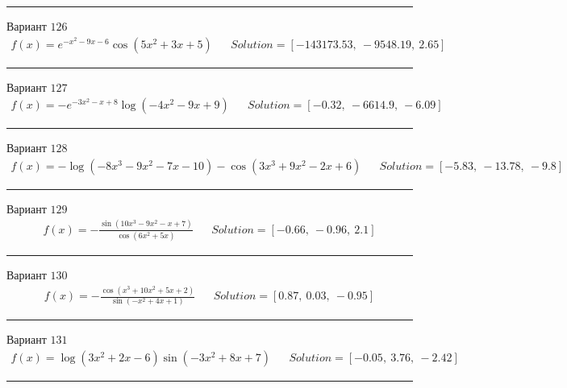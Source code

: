 \documentclass[11pt]{report}
\begin{document}
\begin{center}
    \noindent\rule{8cm}{0.4pt}
\end{center}
Вариант \(126\)
\begin{align*}
    f(x) = e^{- x^{2} - 9 x - 6} \cos{\left(5 x^{2} + 3 x + 5 \right)} && Solution = \left[ -143173.53, \  -9548.19, \  2.65\right]
\end{align*}
\begin{center}
    \noindent\rule{8cm}{0.4pt}
\end{center}
Вариант \(127\)
\begin{align*}
    f(x) = - e^{- 3 x^{2} - x + 8} \log{\left(- 4 x^{2} - 9 x + 9 \right)} && Solution = \left[ -0.32, \  -6614.9, \  -6.09\right]
\end{align*}
\begin{center}
    \noindent\rule{8cm}{0.4pt}
\end{center}
Вариант \(128\)
\begin{align*}
    f(x) = - \log{\left(- 8 x^{3} - 9 x^{2} - 7 x - 10 \right)} - \cos{\left(3 x^{3} + 9 x^{2} - 2 x + 6 \right)} && Solution = \left[ -5.83, \  -13.78, \  -9.8\right]
\end{align*}
\begin{center}
    \noindent\rule{8cm}{0.4pt}
\end{center}
Вариант \(129\)
\begin{align*}
    f(x) = - \frac{\sin{\left(10 x^{3} - 9 x^{2} - x + 7 \right)}}{\cos{\left(6 x^{2} + 5 x \right)}} && Solution = \left[ -0.66, \  -0.96, \  2.1\right]
\end{align*}
\begin{center}
    \noindent\rule{8cm}{0.4pt}
\end{center}
Вариант \(130\)
\begin{align*}
    f(x) = - \frac{\cos{\left(x^{3} + 10 x^{2} + 5 x + 2 \right)}}{\sin{\left(- x^{2} + 4 x + 1 \right)}} && Solution = \left[ 0.87, \  0.03, \  -0.95\right]
\end{align*}
\begin{center}
    \noindent\rule{8cm}{0.4pt}
\end{center}
Вариант \(131\)
\begin{align*}
    f(x) = \log{\left(3 x^{2} + 2 x - 6 \right)} \sin{\left(- 3 x^{2} + 8 x + 7 \right)} && Solution = \left[ -0.05, \  3.76, \  -2.42\right]
\end{align*}
\begin{center}
    \noindent\rule{8cm}{0.4pt}
\end{center}
\end{document}
